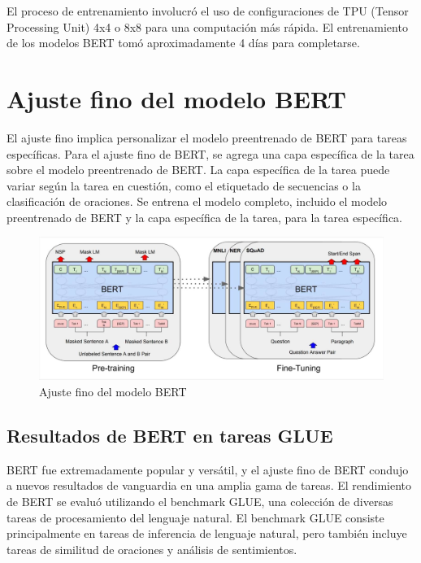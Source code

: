 El proceso de entrenamiento involucró el uso de configuraciones de TPU (Tensor Processing Unit) 4x4 o 8x8 para una computación más rápida. El entrenamiento de los modelos BERT tomó aproximadamente 4 días para completarse.

\section{Ajuste fino del modelo BERT}

El ajuste fino implica personalizar el modelo preentrenado de BERT para tareas específicas. Para el ajuste fino de BERT, se agrega una capa específica de la tarea sobre el modelo preentrenado de BERT. La capa específica de la tarea puede variar según la tarea en cuestión, como el etiquetado de secuencias o la clasificación de oraciones. Se entrena el modelo completo, incluido el modelo preentrenado de BERT y la capa específica de la tarea, para la tarea específica.

\begin{figure}[h]
  \centering
  \includegraphics[scale=0.2]{pics/BERTFineTuning.png}
  \caption{Ajuste fino del modelo BERT}
\end{figure}

\subsection{Resultados de BERT en tareas GLUE}

BERT fue extremadamente popular y versátil, y el ajuste fino de BERT condujo a nuevos resultados de vanguardia en una amplia gama de tareas. El rendimiento de BERT se evaluó utilizando el benchmark GLUE, una colección de diversas tareas de procesamiento del lenguaje natural. El benchmark GLUE consiste principalmente en tareas de inferencia de lenguaje natural, pero también incluye tareas de similitud de oraciones y análisis de sentimientos.

